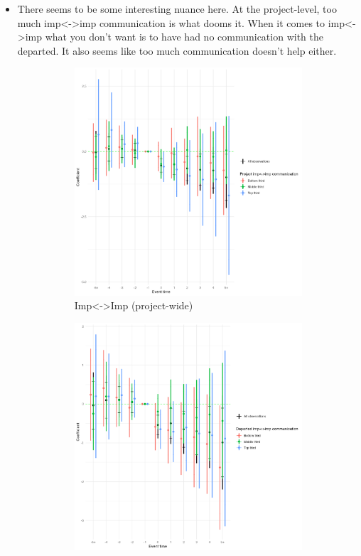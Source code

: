 \documentclass[12pt,notitlepage]{article}
\begin{document}
\begin{itemize}
    \item There seems to be some interesting nuance here. At the project-level, too much imp<->imp communication is what dooms it. When it comes to imp<->imp what you don't want is to have had no communication with the departed. It also seems like too much communication doesn't help either.  
\begin{figure}[hp]
  \centering
  \begin{subfigure}[b]{0.48\textwidth}
    \centering
    \includegraphics[width=\textwidth]{temp/imp_imp_combined_2p_back_bin_third.png}
    \caption{Imp<->Imp (project-wide)}
  \end{subfigure}
  \hfill
  \begin{subfigure}[b]{0.48\textwidth}
    \centering
    \includegraphics[width=\textwidth]{temp/imp_imp_dept_combined_2p_back_bin_third.png}

\end{subfigure}
\end{figure}
\end{itemize}
\end{document}
